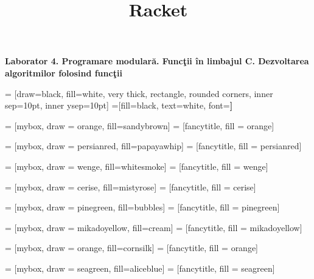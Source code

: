 \documentclass[a4paper]{article}
\title{Racket}
\begin{document}
\begin{center}{\huge{\textbf{Laborator 4. Programare modulară. Funcţii în limbajul C. Dezvoltarea algoritmilor folosind funcţii }}}
\end{center}
\begin{multicols*}{3}

 = [draw=black, fill=white, very thick,
    rectangle, rounded corners, inner sep=10pt, inner ysep=10pt]
 =[fill=black, text=white, font=\bfseries]

 = [mybox, draw = orange, fill=sandybrown]
 = [fancytitle, fill = orange]


 = [mybox, draw = persianred, fill=papayawhip]
 = [fancytitle, fill = persianred]

 = [mybox, draw = wenge, fill=whitesmoke]
 = [fancytitle, fill = wenge]

 = [mybox, draw = cerise, fill=mistyrose]
 = [fancytitle, fill = cerise]

 = [mybox, draw = pinegreen, fill=bubbles]
 = [fancytitle, fill = pinegreen]

 = [mybox, draw = mikadoyellow, fill=cream]
 = [fancytitle, fill = mikadoyellow]

 = [mybox, draw = orange, fill=cornsilk]
 = [fancytitle, fill = orange]

 = [mybox, draw = seagreen, fill=aliceblue]
 = [fancytitle, fill = seagreen]


\end{multicols*}
\end{document}
